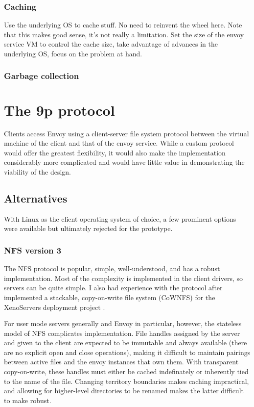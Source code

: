 \subsubsection{Caching}

Use the underlying OS to cache stuff. No need to reinvent the wheel here. Note that this makes good sense, it's not really a limitation. Set the size of the envoy service VM to control the cache size, take advantage of advances in the underlying OS, focus on the problem at hand.

\subsubsection{Garbage collection}

\section{The 9p protocol}

Clients access Envoy using a client-server file system protocol between the virtual machine of the client and that of the envoy service. While a custom protocol would offer the greatest flexibility, it would also make the implementation considerably more complicated and would have little value in demonstrating the viability of the design.

\subsection{Alternatives}

With Linux as the client operating system of choice, a few prominent options were available but ultimately rejected for the prototype.

\subsubsection{NFS version 3}

The NFS protocol is popular, simple, well-understood, and has a robust implementation. Most of the complexity is implemented in the client drivers, so servers can be quite simple. I also had experience with the protocol after implemented a stackable, copy-on-write file system (CoWNFS) for the XenoServers deployment project \cite{kotsovinos}.

For user mode servers generally and Envoy in particular, however, the stateless model of NFS complicates implementation. File handles assigned by the server and given to the client are expected to be immutable and always available (there are no explicit open and close operations), making it difficult to maintain pairings between active files and the envoy instances that own them. With transparent copy-on-write, these handles must either be cached indefinately or inherently tied to the name of the file. Changing territory boundaries makes caching impractical, and allowing for higher-level directories to be renamed makes the latter difficult to make robust.


